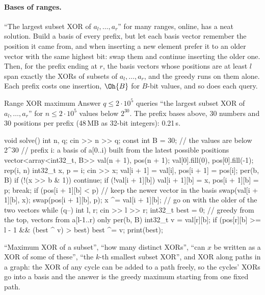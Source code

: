 \paragraph{Bases of ranges.} ``The largest subset XOR of $a_l, \dots, a_r$'' for many ranges, online, has a neat solution. Build a basis
of every prefix, but let each basis vector remember the position it came from, and when inserting a new element prefer it to an older
vector with the same highest bit: swap them and continue inserting the older one. Then, for the prefix ending at $r$, the basis vectors
whose positions are at least $l$ span exactly the XORs of subsets of $a_l, \dots, a_r$, and the greedy runs on them alone. Each prefix
costs one insertion, $\Oh{B}$ for $B$-bit values, and so does each query.

\begin{problem}{Range XOR maximum}
Answer $q \le 2 \cdot 10^5$ queries ``the largest subset XOR of $a_l, \dots, a_r$'' for $n \le 2 \cdot 10^5$ values below $2^{30}$.
\solution The prefix bases above, $30$ numbers and $30$ positions per prefix (48\,MB as 32-bit integers): 0.21\,s.
\end{problem}

\begin{code}
void solve() {
    int n, q;
    cin >> n >> q;
    const int B = 30;  // the values are below 2^30
    // prefix i: a basis of a[0..i) built from the latest possible positions
    vector<array<int32_t, B>> val(n + 1), pos(n + 1);
    val[0].fill(0), pos[0].fill(-1);
    rep(i, n) {
        int32_t x, p = i;
        cin >> x;
        val[i + 1] = val[i], pos[i + 1] = pos[i];
        per(b, B) {
            if (!(x >> b & 1)) continue;
            if (!val[i + 1][b]) {
                val[i + 1][b] = x, pos[i + 1][b] = p;
                break;
            }
            if (pos[i + 1][b] < p) {  // keep the newer vector in the basis
                swap(val[i + 1][b], x);
                swap(pos[i + 1][b], p);
            }
            x ^= val[i + 1][b];  // go on with the older of the two vectors
        }
    }
    while (q--) {
        int l, r;
        cin >> l >> r;
        int32_t best = 0;  // greedy from the top, vectors from a[l-1..r) only
        per(b, B) {
            int32_t v = val[r][b];
            if (pos[r][b] >= l - 1 && (best ^ v) > best) best ^= v;
        }
        print(best);
    }
}
\end{code}

\begin{recognize}
``Maximum XOR of a subset'', ``how many distinct XORs'', ``can $x$ be written as a XOR of some of these'', ``the $k$-th smallest subset
XOR'', and XOR along paths in a graph: the XOR of any cycle can be added to a path freely, so the cycles' XORs go into a basis and the
answer is the greedy maximum starting from one fixed path.
\end{recognize}

